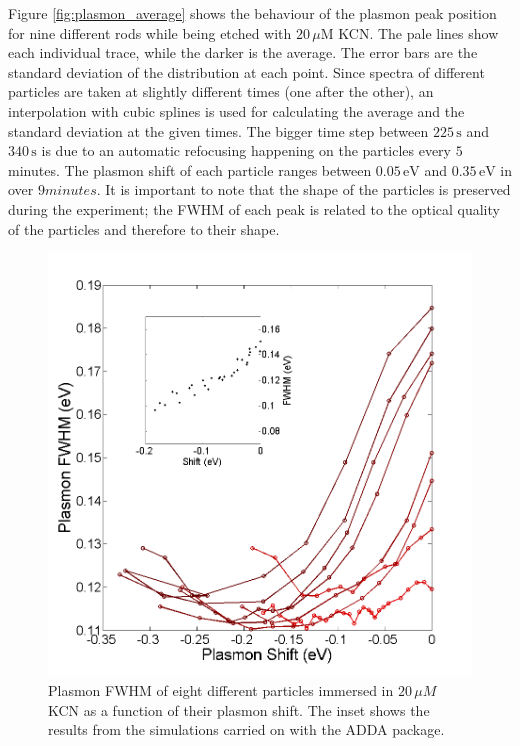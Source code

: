 \documentclass{article}
\begin{document}
Figure \ref{fig:plasmon_average} shows the behaviour of the plasmon peak
position for nine different rods while being etched with $20\,\mu\textrm{M}$
KCN. The pale lines show each individual trace, while the darker is the average.
The error bars are the standard deviation of the distribution at each point.
Since spectra of different particles are taken at slightly different times (one
after the other), an interpolation with cubic splines is used for calculating
the average and the standard deviation at the given times. The bigger time step
between $225\,\textrm{s}$ and $340\,\textrm{s}$ is due to an automatic
refocusing happening on the particles every $5$ minutes. The plasmon shift of
each particle ranges between $0.05\,\textrm{eV}$ and $0.35\,\textrm{eV}$ in over
$9 minutes$. It is important to note that the shape of the particles is
preserved during the experiment; the FWHM of each peak is related to the optical
quality of the particles and therefore to their shape.

\begin{figure}[p]
 \centering
 \includegraphics[width=0.95\linewidth]{fwhm_several_in_eV.png}
 \caption{Plasmon FWHM of eight different particles immersed in $20\,\mu M$ KCN
 as a function of their plasmon shift. The inset shows the results from the
 simulations carried on with the ADDA package.}
 \label{fig:FWHM}
\end{figure}
\end{document}
